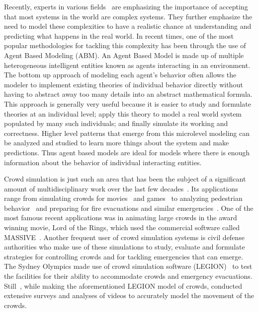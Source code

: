Recently, experts in various fields~\cite{Arthur:2010uy} are emphasizing the importance of accepting that most systems in the world are complex systems. They further emphasize the need to model these complexities to have a realistic chance at understanding and predicting what happens in the real world. In recent times, one of the most popular methodologies for tackling this complexity has been through the use of Agent Based Modeling (ABM). An Agent Based Model is made up of multiple heterogeneous intelligent entities known as agents interacting in an environment. The bottom up approach of modeling each agent's behavior often allows the modeler to implement existing theories of individual behavior directly without having to abstract away too many details into an abstract mathematical formula. This approach is generally very useful because it is easier to study and formulate theories at an individual level; apply this theory to model a real world system populated by many such individuals; and finally simulate its working and correctness. Higher level patterns that emerge from this microlevel modeling can be analyzed and studied to learn more things about the system and make predictions. Thus agent based models are ideal for models where there is enough information about the behavior of individual interacting entities.

Crowd simulation is just such an area that has been the subject of a significant amount of multidisciplinary work over the last few decades~\cite{Still:2000tp,Zhou:2010:CMS:1842722.1842725,Gwynne1999741}. Its applications range from simulating crowds for movies~\cite{Regelous:2011vt,Reynolds:1987vm} and games~\cite{Snape:2012,ageOfEmpires:2013} to analyzing pedestrian behavior~\cite{PhysRevE.51.4282,Viswanathan:ut,Guy:2010uv} and preparing for fire evacuations and similar emergencies~\cite{Klupfel:2005to,PEDFull:2011,Mordvintsev:2012}. One of the most famous recent applications was in animating large crowds in the award winning movie, Lord of the Rings, which used the commercial software called MASSIVE~\cite{Regelous:2011vt}. Another frequent user of crowd simulation systems is civil defense authorities who make use of these simulations to study, evaluate and formulate strategies for controlling crowds and for tackling emergencies that can emerge. The Sydney Olympics made use of crowd simulation software (LEGION)~\cite{Still:2000tp} to test the facilities for their ability to accommodate crowds and emergency evacuations. Still~\cite{Still:2000tp}, while making the aforementioned LEGION model of crowds, conducted extensive surveys and analyses of videos to accurately model the movement of the crowds.

